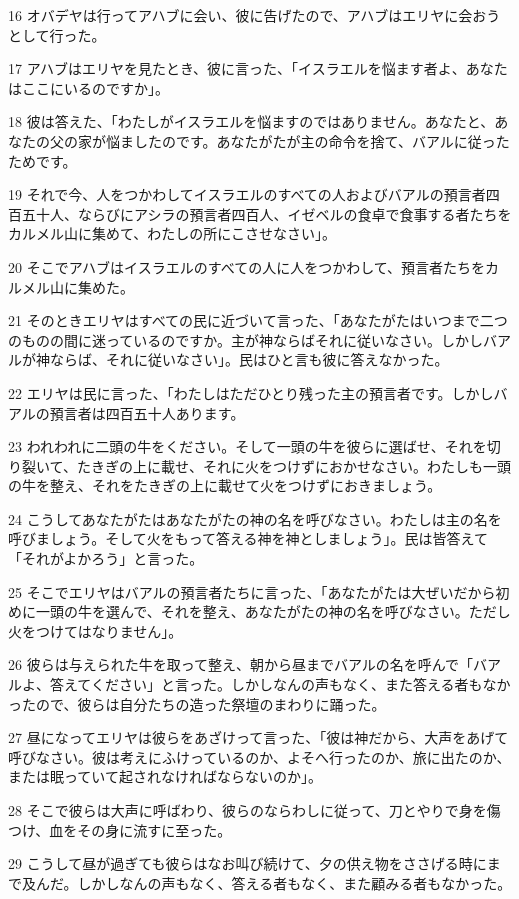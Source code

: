 \par 16 オバデヤは行ってアハブに会い、彼に告げたので、アハブはエリヤに会おうとして行った。
\par 17 アハブはエリヤを見たとき、彼に言った、「イスラエルを悩ます者よ、あなたはここにいるのですか」。
\par 18 彼は答えた、「わたしがイスラエルを悩ますのではありません。あなたと、あなたの父の家が悩ましたのです。あなたがたが主の命令を捨て、バアルに従ったためです。
\par 19 それで今、人をつかわしてイスラエルのすべての人およびバアルの預言者四百五十人、ならびにアシラの預言者四百人、イゼベルの食卓で食事する者たちをカルメル山に集めて、わたしの所にこさせなさい」。
\par 20 そこでアハブはイスラエルのすべての人に人をつかわして、預言者たちをカルメル山に集めた。
\par 21 そのときエリヤはすべての民に近づいて言った、「あなたがたはいつまで二つのものの間に迷っているのですか。主が神ならばそれに従いなさい。しかしバアルが神ならば、それに従いなさい」。民はひと言も彼に答えなかった。
\par 22 エリヤは民に言った、「わたしはただひとり残った主の預言者です。しかしバアルの預言者は四百五十人あります。
\par 23 われわれに二頭の牛をください。そして一頭の牛を彼らに選ばせ、それを切り裂いて、たきぎの上に載せ、それに火をつけずにおかせなさい。わたしも一頭の牛を整え、それをたきぎの上に載せて火をつけずにおきましょう。
\par 24 こうしてあなたがたはあなたがたの神の名を呼びなさい。わたしは主の名を呼びましょう。そして火をもって答える神を神としましょう」。民は皆答えて「それがよかろう」と言った。
\par 25 そこでエリヤはバアルの預言者たちに言った、「あなたがたは大ぜいだから初めに一頭の牛を選んで、それを整え、あなたがたの神の名を呼びなさい。ただし火をつけてはなりません」。
\par 26 彼らは与えられた牛を取って整え、朝から昼までバアルの名を呼んで「バアルよ、答えてください」と言った。しかしなんの声もなく、また答える者もなかったので、彼らは自分たちの造った祭壇のまわりに踊った。
\par 27 昼になってエリヤは彼らをあざけって言った、「彼は神だから、大声をあげて呼びなさい。彼は考えにふけっているのか、よそへ行ったのか、旅に出たのか、または眠っていて起されなければならないのか」。
\par 28 そこで彼らは大声に呼ばわり、彼らのならわしに従って、刀とやりで身を傷つけ、血をその身に流すに至った。
\par 29 こうして昼が過ぎても彼らはなお叫び続けて、夕の供え物をささげる時にまで及んだ。しかしなんの声もなく、答える者もなく、また顧みる者もなかった。
